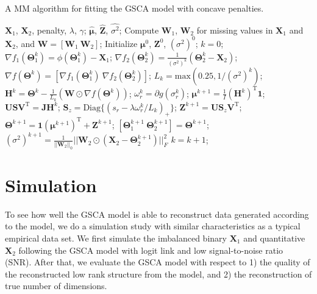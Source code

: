 \begin{algorithm}[htb]
  \caption{A MM algorithm for fitting the GSCA model with concave penalties.}
  \label{alg:GSCA}
  \begin{algorithmic}[1]
    \Require
      $\mathbf{X}_1$, $\mathbf{X}_2$, penalty, $\lambda$, $\gamma$;
    \Ensure
      $\hat{\bm{\mu}}$, $\hat{\mathbf{Z}}$, $\hat{\sigma^2}$;
    \State Compute $\mathbf{W}_1$, $\mathbf{W}_2$ for missing values in $\mathbf{X}_1$ and $\mathbf{X}_2$, and $\mathbf{W} = [\mathbf{W}_1 ~ \mathbf{W}_2]$;
    \State Initialize $\bm{\mu}^0$, $\mathbf{Z}^0$, $(\sigma^2)^0$;
    \State $k = 0$;
        \State $\nabla f_1(\mathbf{\Theta}_1^k) = \phi(\mathbf{\Theta}_1^k) - \mathbf{X}_1$; $\nabla f_2(\mathbf{\Theta}_2^k) = \frac{1}{(\sigma^2)^k} (\mathbf{\Theta}_2^k - \mathbf{X}_2)$;
        \State $\nabla f(\mathbf{\Theta}^k) = [\nabla f_1(\mathbf{\Theta}_1^k) ~ \nabla f_2(\mathbf{\Theta}_2^k)]$;
        \State $L_k=\text{max}(0.25,1/(\sigma^2)^k)$;
        \State $\mathbf{H}^{k} = \mathbf{\Theta}^{k}- \frac{1}{L_{k}} (\mathbf{W} \odot \nabla f(\mathbf{\Theta}^{k}))$;
        \State $\omega_r^k = \partial g(\sigma_r^k)$;
        \State $\bm{\mu}^{k+1} = \frac{1}{I} (\mathbf{H}^{k})^{\text{T}} \mathbf{1}$;
        \State $\mathbf{USV}^{\text{T}} = \mathbf{J}\mathbf{H}^{k}$;
        \State $\mathbf{S}_{z} = \text{Diag}\{ (s_{r} - \lambda \omega_r^k /L_{k})_{+}\}$;
        \State $\mathbf{Z}^{k+1} = \mathbf{US}_{z}\mathbf{V}^{\text{T}}$;
        \State $\mathbf{\Theta}^{k+1} = \mathbf{1}(\bm{\mu}^{k+1})^{\text{T}} + \mathbf{Z}^{k+1}$;
        \State $[\mathbf{\Theta}_1^{k+1} ~ \mathbf{\Theta}_2^{k+1}] = \mathbf{\Theta}^{k+1}$;
        \State $(\sigma^2)^{k+1} = \frac{1}{||\mathbf{W}_2||_0} ||\mathbf{W}_2 \odot (\mathbf{X}_2 - \mathbf{\Theta}_2^{k+1})||_F^2$
        \State $k=k+1$;
    \EndWhile
  \end{algorithmic}
\end{algorithm}

\section{Simulation}  \label{section:4.4}
To see how well the GSCA model is able to reconstruct data generated according to the model, we do a simulation study with similar characteristics as a typical empirical data set. We first simulate the imbalanced binary $\mathbf{X}_1$ and quantitative $\mathbf{X}_2$ following the GSCA model with logit link and low signal-to-noise ratio (SNR). After that, we evaluate the GSCA model with respect to 1) the quality of the reconstructed low rank structure from the model, and 2) the reconstruction of true number of dimensions.

